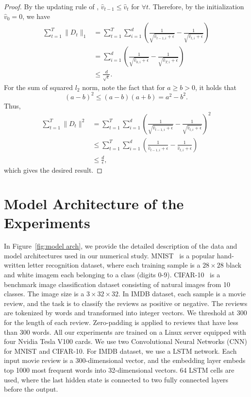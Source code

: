 \documentclass[11pt]{article}
\begin{document}
\begin{proof}
By the updating rule of \algo, $\hat v_{t-1}\leq \hat v_t$ for $\forall t$. Therefore, by the initialization $\hat v_0=0$, we have
\begin{align*}
    \sum_{t=1}^T \|D_t\|_1 &=\sum_{t=1}^T \sum_{i=1}^d (\frac{1}{\sqrt{\hat v_{t-1,i}+\epsilon}}-\frac{1}{\sqrt{\hat v_{t,i}+\epsilon}})\\
    &=\sum_{i=1}^d (\frac{1}{\sqrt{\hat v_{0,i}+\epsilon}}-\frac{1}{\sqrt{\hat v_{T,i}+\epsilon}})\\
    &\leq \frac{d}{\sqrt\epsilon}.
\end{align*}
For the sum of squared $l_2$ norm, note the fact that for $a\geq b>0$, it holds that
\begin{equation*}
    (a-b)^2\leq (a-b)(a+b)=a^2-b^2.
\end{equation*}
Thus,
\begin{align*}
    \sum_{t=1}^T \|D_t\|^2&=\sum_{t=1}^T \sum_{i=1}^d (\frac{1}{\sqrt{\hat v_{t-1,i}+\epsilon}}-\frac{1}{\sqrt{\hat v_{t,i}+\epsilon}})^2\\
    &\leq \sum_{t=1}^T \sum_{i=1}^d (\frac{1}{\hat v_{t-1,i}+\epsilon}-\frac{1}{\hat v_{t,i}+\epsilon})\\
    &\leq \frac{d}{\epsilon},
\end{align*}
which gives the desired result.
\end{proof}




\section{Model Architecture of the Experiments} \label{app:experiment}


In Figure~\ref{fig:model arch}, we provide the detailed description of the data and model architectures used in our numerical study. MNIST~\cite{mnist} is a popular hand-written letter recognition dataset, where each training sample is a $28\times 28$ black and white imagem each belonging to a class (digits 0-9). CIFAR-10~\cite{cifar} is a benchmark image classification dataset consisting of natural images from 10 classes. The image size is a $3\times 32\times 32$. In IMDB dataset, each sample is a movie review, and the task is to classify the reviews as positive or negative. The reviews are tokenized by words and transformed into integer vectors. We threshold at 300 for the length of each review. Zero-padding is applied to reviews that have less than 300 words. All our experiments are trained on a Linux server equipped with four Nvidia Tesla V100 cards. We use two Convolutional Neural Networks (CNN) for MNIST and CIFAR-10. For IMDB dataset, we use a LSTM network. Each input movie review is a 300-dimensional vector, and the embedding layer embeds top 1000 most frequent words into 32-dimensional vectors. 64 LSTM cells are used, where the last hidden state is connected to two fully connected layers before the output.
\end{document}

